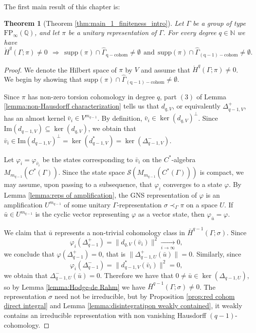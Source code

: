 \documentclass[12pt,reqno]{amsart}
\newcommand{\N}{\mathbb{N}}
\newcommand{\Q}{\mathbb{Q}}
\newtheorem{theorem}{Theorem}[section]
\theoremstyle{definition}
\newcommand{\torH}{\mathring{H}}
\begin{document}
The first main result of this chapter is:

\begin{theorem}[Theorem \ref{thm:main_1_finiteness_intro}]\label{thm:main thm finit prop 1}
    Let $\Gamma$ be a group of type $\mathrm{FP}_\infty(\Q)$, and let $\pi$ be a unitary representation of $\Gamma$. For every degree $q\in\N$ we have
    \[ \torH^q(\Gamma;\pi)\neq 0~~ \Longrightarrow~~ \mathrm{supp}(\pi) \cap \widehat{\Gamma}_{\mathrm{q-cohom}} \neq \emptyset ~~\text{and}~~ \mathrm{supp}(\pi) \cap \widehat{\Gamma}_{\mathrm{(q-1)-cohom}} \neq \emptyset.\]
\end{theorem}
\begin{proof}
    We denote the Hilbert space of $\pi$ by $V$ and assume that $\torH^q(\Gamma;\pi) \ne 0$. We begin by showing that $\mathrm{supp}(\pi) \cap \widehat{\Gamma}_{\mathrm{(q-1)-cohom}} \neq \emptyset$. 
    
    Since $\pi$ has non-zero torsion cohomology in degree $q$, part $(3)$ of Lemma \ref{lemma:non-Hausdorff characterization} tells us that $d_{q,V}$, or equivalently $\Delta_{q-1,V}^+$, has an almost kernel $\bar{v}_i \in V^{m_{q-1}}$. By definition, $\bar{v}_i \in \ker(d_{q,V})^{\perp}$. Since $\mathrm{Im}(d_{q-1,V}) \subseteq \ker(d_{q,V})$, we obtain that $\bar{v}_i \in \mathrm{Im}(d_{q-1,V})^\perp=\ker(d_{q-1,V}^*)=\ker(\Delta_{q-1,V}^-)$.

    Let $\varphi_i=\varphi_{\bar{v}_i}$ be the states corresponding to $\bar{v}_i$ on the $C^*$-algebra $M_{m_{q-1}}(C^*(\Gamma))$. Since the state space $\mathcal{S}(M_{m_{q-1}}(C^*(\Gamma)))$ is compact, we may assume, upon passing to a subsequence, that $\varphi_i$ converges to a state $\varphi$. By Lemma \ref{lemma:reps of amplification}, the GNS representation of $\varphi$ is an amplification $U^{m_{q-1}}$ of some unitary $\Gamma$-representation $\sigma \prec_\Gamma \pi$ on a space $U$. If $\bar{u} \in U^{m_{q-1}}$ is the cyclic vector representing $\varphi$ as a vector state, then $\varphi_{\bar{u}}=\varphi$.
    
    We claim that $\bar{u}$ represents a non-trivial cohomology class in $\bar{H}^{q-1}(\Gamma;\sigma)$. Since \[\varphi_i(\Delta_{q-1}^+) = \|d_{q,V}( \bar{v}_i)\|^2 \xrightarrow[i \rightarrow \infty]{}0,\] 
    we conclude that $\varphi(\Delta_{q-1}^+) = 0$, that is $\|\Delta_{q-1,U}^+(\bar{u})\| = 0$. Similarly, since \[\varphi_i(\Delta_{q-1}^-) = \|d_{q-1,V}^*( \bar{v}_i)\|^2 =0,\] we obtain that $\Delta_{q-1,U}^-( \bar{u} )= 0$. Therefore we have that $0 \neq \bar{u} \in \ker(\Delta_{q-1,U})$, so by Lemma \ref{lemma:Hodge-de Rahm} we have $\bar{H}^{q-1}(\Gamma;\sigma) \neq 0$. The representation $\sigma$ need not be irreducible, but by Proposition \ref{prop:red cohom direct integral} and Lemma \ref{lemma:disintegratipon weakly contained}, it weakly contains an irreducible representation with non vanishing Hausdorff $(q-1)$-cohomology.
    

\end{proof}
\end{document}
